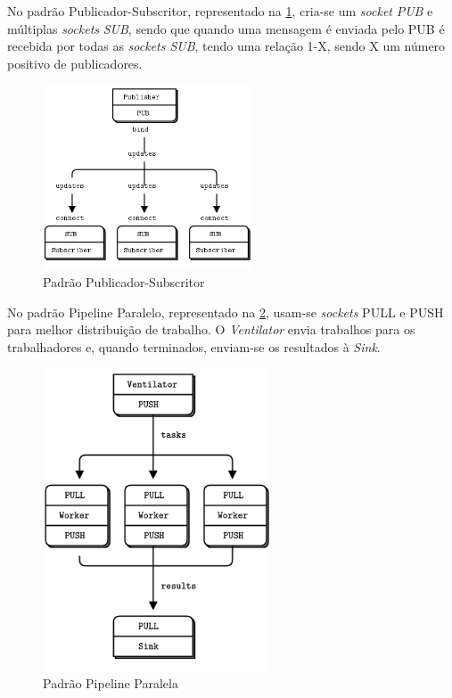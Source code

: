 No padrão Publicador-Subscritor, representado na \cref{fig:zmq_pub-sub}, cria-se um \textit{socket} \textit{PUB} e múltiplas \textit{sockets} \textit{SUB}, sendo que quando uma mensagem é enviada pelo PUB é recebida por todas as \textit{sockets SUB}, tendo uma relação 1-X, sendo X um número positivo de publicadores.

\begin{figure}[!ht]
    \centering
    \includegraphics[width=0.55\textwidth]{images/zeromq/pub-sub.png}
    \caption{Padrão Publicador-Subscritor}
    \label{fig:zmq_pub-sub}
\end{figure}

No padrão Pipeline Paralelo, representado na \cref{fig:zmq_pipeline}, usam-se \textit{sockets} PULL e PUSH para melhor distribuição de trabalho. O \textit{Ventilator} envia trabalhos para os trabalhadores e, quando terminados, enviam-se os resultados à \textit{Sink}.

\begin{figure}
    \centering
    \includegraphics[width=0.6\textwidth]{images/zeromq/pipeline.png}
    \caption{Padrão Pipeline Paralela}
    \label{fig:zmq_pipeline}
\end{figure}

